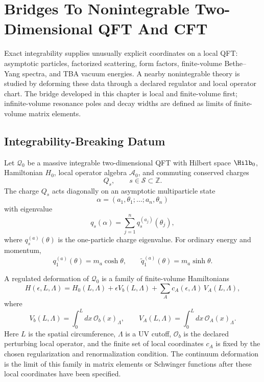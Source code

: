 \chapter{Bridges To Nonintegrable Two-Dimensional QFT And CFT}
\label{ch:integrable-bridges-nonintegrable-two-dimensional-qft}

\ConventionsMixedCFT

Exact integrability supplies unusually explicit coordinates on a local QFT:
asymptotic particles, factorized scattering, form factors, finite-volume
Bethe--Yang spectra, and TBA vacuum energies.  A nearby nonintegrable theory
is studied by deforming these data through a declared regulator and local
operator chart.  The bridge developed in this chapter is local and
finite-volume first; infinite-volume resonance poles and decay widths are
defined as limits of finite-volume matrix elements.

\section{Integrability-Breaking Datum}

Let \(\mathcal Q_0\) be a massive integrable two-dimensional QFT with Hilbert
space \(\Hilb_0\), Hamiltonian \(H_0\), local operator algebra
\(\mathcal A_0\), and commuting conserved charges
\[
  Q_s,\qquad s\in\mathcal S\subset\mathbb Z .
\]
The charge \(Q_s\) acts diagonally on an asymptotic multiparticle state
\[
  \alpha=(a_1,\theta_1;\ldots;a_n,\theta_n)
\]
with eigenvalue
\[
  q_s(\alpha)=\sum_{j=1}^n q_s^{(a_j)}(\theta_j),
\]
where \(q_s^{(a)}(\theta)\) is the one-particle charge eigenvalue.  For
ordinary energy and momentum,
\[
  q_1^{(a)}(\theta)=m_a\cosh\theta,\qquad
  \widetilde q_1^{(a)}(\theta)=m_a\sinh\theta .
\]

\begin{definition}
\label{def:regulated-integrability-breaking-deformation}
A regulated deformation of \(\mathcal Q_0\) is a family of finite-volume
Hamiltonians
\[
  H(\epsilon,L,\Lambda)
  =
  H_0(L,\Lambda)
  +
  \epsilon V_b(L,\Lambda)
  +
  \sum_A c_A(\epsilon,\Lambda)\,V_A(L,\Lambda),
\]
where
\[
  V_b(L,\Lambda)=\int_0^L dx\,\mathcal O_b(x)_\Lambda,
  \qquad
  V_A(L,\Lambda)=\int_0^L dx\,\mathcal O_A(x)_\Lambda .
\]
Here \(L\) is the spatial circumference, \(\Lambda\) is a UV cutoff,
\(\mathcal O_b\) is the declared perturbing local operator, and the finite
set of local coordinates \(c_A\) is fixed by the chosen regularization and
renormalization condition.  The continuum deformation is the limit of this
family in matrix elements or Schwinger functions after these local
coordinates have been specified.
\end{definition}


